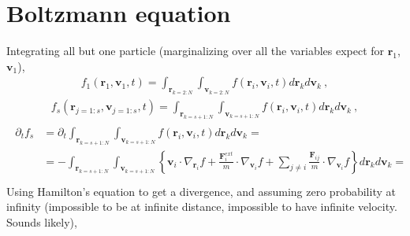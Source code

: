\documentclass[letterpaper,10pt,english]{jupyterBook}
\begin{document}
\section{Boltzmann equation}
\label{\detokenize{ch/statistical-mechanics/liouville-boltzmann:boltzmann-equation}}\label{\detokenize{ch/statistical-mechanics/liouville-boltzmann:statistical-mechanics-boltzmann}}
\sphinxAtStartPar
{} 

\sphinxAtStartPar
{} Integrating all but one particle (marginalizing over all the variables expect for \(\mathbf{r}_1\), \(\mathbf{v}_1\)),
\begin{equation*}
\begin{split}f_1(\mathbf{r}_1, \mathbf{v}_1, t) = \int_{\mathbf{r}_{k=2:N}} \int_{\mathbf{v}_{k=2:N}} f(\mathbf{r}_i,\mathbf{v}_i, t) d \mathbf{r}_k d \mathbf{v}_k \ ,\end{split}
\end{equation*}
\sphinxAtStartPar
{}
\begin{equation*}
\begin{split}f_s(\mathbf{r}_{j=1:s}, \mathbf{v}_{j=1:s}, t) = \int_{\mathbf{r}_{k=s+1:N}} \int_{\mathbf{v}_{k=s+1:N}} f(\mathbf{r}_i,\mathbf{v}_i, t) d \mathbf{r}_k d \mathbf{v}_k \ ,\end{split}
\end{equation*}
\sphinxAtStartPar
{}
\begin{equation*}
\begin{split}\begin{aligned}
  \partial_t f_s
  & = \partial_t \int_{\mathbf{r}_{k=s+1:N}} \int_{\mathbf{v}_{k=s+1:N}} f(\mathbf{r}_i,\mathbf{v}_i, t) d \mathbf{r}_k d \mathbf{v}_k = \\
  & = - \int_{\mathbf{r}_{k=s+1:N}} \int_{\mathbf{v}_{k=s+1:N}} \left\{ \mathbf{v}_i \cdot \nabla_{\mathbf{r}_i} f + \frac{\mathbf{F}_i^{ext}}{m} \cdot \nabla_{\mathbf{v}_i} f + \sum_{j \ne i} \frac{\mathbf{F}_{ij}}{m} \cdot \nabla_{\mathbf{v}_i} f \right\} d \mathbf{r}_k d \mathbf{v}_k = \\
\end{aligned}\end{split}
\end{equation*}
\sphinxAtStartPar
Using Hamilton’s equation to get a divergence, and assuming zero probability at infinity (impossible to be at infinite distance, impossible to have infinite velocity. Sounds likely),
\end{document}
